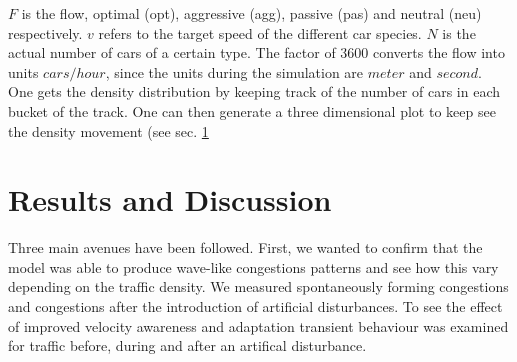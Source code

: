 \documentclass[11pt,a4paper,twocolumn]{article}
\begin{document}
$F$ is the flow, optimal (opt), aggressive (agg), passive (pas) and neutral (neu) respectively. $v$ refers to the target speed of the different car species. $N$ is the actual number of cars of a certain type. The factor of $3600$ converts the flow into units $cars/hour$, since the units during the simulation are $meter$ and $second$.\\
One gets the density distribution by keeping track of the number of cars in each bucket of the track. One can then generate a three dimensional plot to keep see the density movement (see sec. \ref{sec:results}



\section{Results and Discussion}\label{sec:results}
Three main avenues have been followed. First, we wanted to confirm that the model was able to produce wave-like congestions patterns and see how this vary depending on the traffic density. We measured spontaneously forming congestions and congestions after the introduction of artificial disturbances. To see the effect of improved velocity awareness and adaptation transient behaviour was examined for traffic before, during and after an artifical disturbance. 




\end{document}
